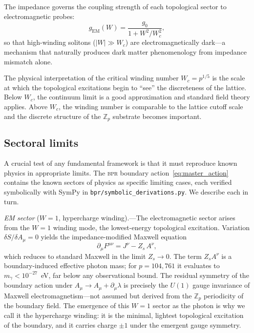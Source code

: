 \documentclass[aps,prd,twocolumn,superscriptaddress,longbibliography,nofootinbib]{revtex4-2}
\newcommand{\Zp}{\mathbb{Z}_p}
\newcommand{\Wc}{W_{\!c}}
\newcommand{\bpr}{\textsc{bpr}}
\begin{document}
The impedance governs the coupling strength of each topological
sector to electromagnetic probes:
\begin{equation}
g_{\mathrm{EM}}(W) = \frac{g_0}{1 + W^2/\Wc^2},
\label{eq:em_coupling}
\end{equation}
so that high-winding solitons ($|W| \gg \Wc$) are
electromagnetically dark---a mechanism that naturally produces dark
matter phenomenology from impedance mismatch alone.

The physical interpretation of the critical winding number
$\Wc = p^{1/5}$ is the scale at which the topological excitations
begin to ``see'' the discreteness of the lattice.  Below $\Wc$,
the continuum limit is a good approximation and standard field
theory applies.  Above $\Wc$, the winding number is comparable to
the lattice cutoff scale and the discrete structure of the $\Zp$
substrate becomes important.

\subsection{Sectoral limits}

A crucial test of any fundamental framework is that it must reproduce
known physics in appropriate limits.  The \bpr{} boundary
action~\eqref{eq:master_action} contains the known sectors of
physics as specific limiting cases, each verified symbolically with
SymPy in \texttt{bpr/symbolic\_derivations.py}.  We describe each
in turn.

\textit{EM sector} ($W = 1$, hypercharge winding).---The
electromagnetic sector arises from the $W = 1$ winding mode, the
lowest-energy topological excitation.  Variation
$\delta S / \delta A_\mu = 0$ yields the impedance-modified Maxwell
equation
\begin{equation}
\partial_\mu F^{\mu\nu} = J^\nu - Z_s\, A^\nu,
\label{eq:maxwell}
\end{equation}
which reduces to standard Maxwell in the limit $Z_s \to 0$.
The term $Z_s A^\nu$ is a boundary-induced effective photon mass; for
$p = 104{,}761$ it evaluates to $m_\gamma < 10^{-27}$~eV, far below
any observational bound.  The residual symmetry of the boundary
action under $A_\mu \to A_\mu + \partial_\mu \lambda$ is precisely
the $U(1)$ gauge invariance of Maxwell electromagnetism---not assumed
but derived from the $\Zp$ periodicity of the boundary field.
The emergence of this $W = 1$ sector as the photon is why we
call it the hypercharge winding: it is the minimal, lightest
topological excitation of the boundary, and it carries charge $\pm 1$
under the emergent gauge symmetry.
\end{document}
